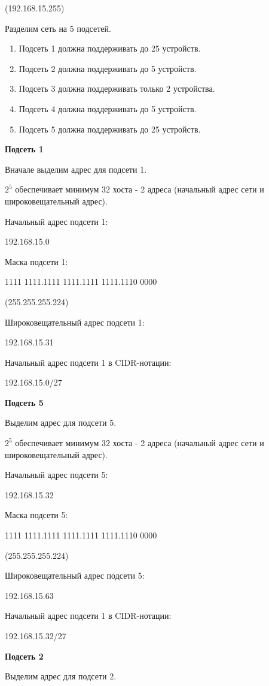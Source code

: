 \documentclass[a4paper,14pt]{article}
\begin{document}
(192.168.15.255)

Разделим сеть на 5 подсетей.

\begin{enumerate}
	\item Подсеть 1 должна поддерживать до 25 устройств.
	\item Подсеть 2 должна поддерживать до 5 устройств.
	\item Подсеть 3 должна поддерживать только 2 устройства.
	\item Подсеть 4 должна поддерживать до 5 устройств.
	\item Подсеть 5 должна поддерживать до 25 устройств.
\end{enumerate}


\textbf{Подсеть 1}

Вначале выделим адрес для подсети 1.

$2^5$ обеспечивает минимум 32 хоста - 2 адреса (начальный адрес сети и широковещательный адрес).

Начальный адрес подсети 1: 

192.168.15.0

Маска подсети 1:

1111 1111.1111 1111.1111 1111.1110 0000

(255.255.255.224)

Широковещательный адрес подсети 1:

192.168.15.31

Начальный адрес подсети 1 в CIDR-нотации:

192.168.15.0/27

\textbf{Подсеть 5}

Выделим адрес для подсети 5.

$2^5$ обеспечивает минимум 32 хоста - 2 адреса (начальный адрес сети и широковещательный адрес).


Начальный адрес подсети 5: 

192.168.15.32

Маска подсети 5:

1111 1111.1111 1111.1111 1111.1110 0000

(255.255.255.224)

Широковещательный адрес подсети 5:

192.168.15.63

Начальный адрес подсети 1 в CIDR-нотации:

192.168.15.32/27


\textbf{Подсеть 2}

Выделим адрес для подсети 2.
\end{document}
